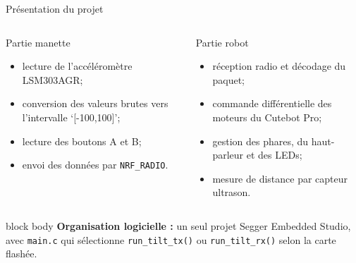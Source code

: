 \documentclass[aspectratio=169]{beamer}
\begin{document}
\begin{frame}{Pr\'esentation du projet}
  \begin{columns}[T,onlytextwidth]
    \begin{block}{Partie manette}
      \begin{itemize}
        \item lecture de l'acc\'el\'erom\`etre LSM303AGR;
        \item conversion des valeurs brutes vers l'intervalle `[-100,100]';
        \item lecture des boutons A et B;
        \item envoi des donn\'ees par \texttt{NRF\_RADIO}.
      \end{itemize}
    \end{block}

    \begin{block}{Partie robot}
      \begin{itemize}
        \item r\'eception radio et d\'ecodage du paquet;
        \item commande diff\'erentielle des moteurs du Cutebot Pro;
        \item gestion des phares, du haut-parleur et des LEDs;
        \item mesure de distance par capteur ultrason.
      \end{itemize}
    \end{block}
  \end{columns}

  \vspace{0.4cm}
  \begin{beamercolorbox}[rounded=true,wd=\textwidth,sep=0.8em]{block body}
    \textbf{Organisation logicielle :} un seul projet Segger Embedded Studio,
    avec \texttt{main.c} qui s\'electionne \texttt{run\_tilt\_tx()} ou
    \texttt{run\_tilt\_rx()} selon la carte flash\'ee.
  \end{beamercolorbox}
\end{frame}
\end{document}
